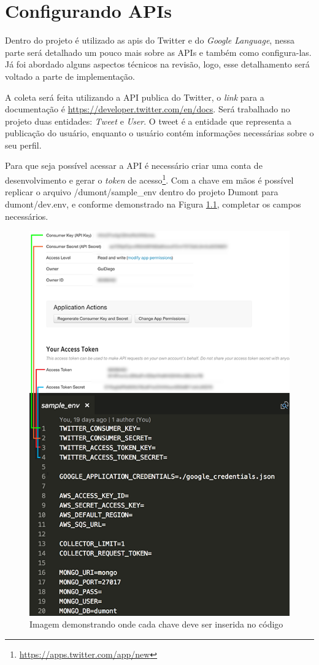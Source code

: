 \chapter{Configurando APIs}
\label{app:configuracoes}
Dentro do projeto é utilizado as apis do Twitter e do \textit{Google Language}, nessa parte será detalhado um pouco mais sobre as APIs e também como configura-las. Já foi abordado alguns aspectos técnicos na revisão, logo, esse detalhamento será voltado a parte de implementação.

A coleta será feita utilizando a API publica do Twitter, o \textit{link} para a documentação é \url{https://developer.twitter.com/en/docs}. Será trabalhado no projeto duas entidades: \textit{Tweet} e \textit{User}. O tweet é a entidade que representa a publicação do usuário, enquanto o usuário contém informações necessárias sobre o seu perfil.

Para que seja possível acessar a API é necessário criar uma conta de desenvolvimento e gerar o \textit{token} de acesso\footnote{\url{https://apps.twitter.com/app/new}}. Com a chave em mãos é possível replicar o arquivo /dumont/sample\_env dentro do projeto Dumont para dumont/dev.env, e conforme demonstrado na Figura \ref{fig:twitteropts}, completar os campos necessários.

\begin{figure}[!ht]
    \centering
    \includegraphics[width=.5\textwidth]{imagens/twitteropts.png}
    \caption{Imagem demonstrando onde cada chave deve ser inserida no código}
    \label{fig:twitteropts}
\end{figure}

